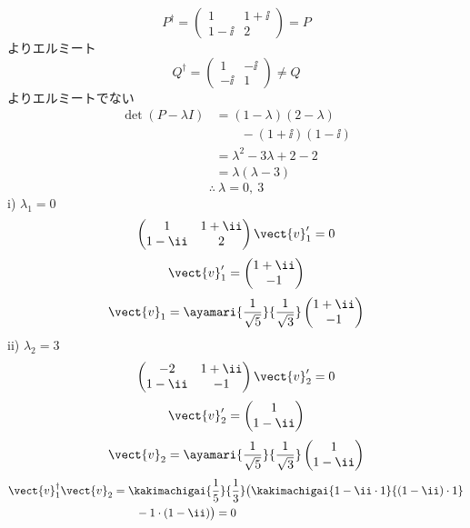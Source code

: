 \[ P^{\dagger}=\begin{pmatrix}1 & 1+\ii\\ 1-\ii & 2\end{pmatrix}=P \]
よりエルミート
\[ Q^{\dagger}=\begin{pmatrix}1 & -\ii\\ -\ii & 1\end{pmatrix}\neq Q \]
よりエルミートでない
\begin{align*}
\det(P-\lambda I)&=(1-\lambda)(2-\lambda)\\
&\qquad-(1+\ii)(1-\ii)\\
&=\lambda^{2}-3\lambda+2-2\\
&=\lambda(\lambda-3)
\end{align*}
\[ \therefore\ \lambda=0,\ 3 \]
i) $\lambda_{1}=0$
\[ \begin{pmatrix}1 & 1+\ii\\ 1-\ii & 2\end{pmatrix}\vect{v}_{1}'=0 \]
\[ \vect{v}_{1}'=\begin{pmatrix}1+\ii\\ -1\end{pmatrix} \]
\[ \vect{v}_{1}=\ayamari{\frac{1}{\sqrt{5}}}{\frac{1}{\sqrt{3}}}\begin{pmatrix}1+\ii\\ -1\end{pmatrix} \]
ii) $\lambda_{2}=3$
\[ \begin{pmatrix}-2 & 1+\ii\\ 1-\ii & -1\end{pmatrix}\vect{v}_{2}'=0 \]
\[ \vect{v}_{2}'=\begin{pmatrix}1\\ 1-\ii\end{pmatrix} \]
\[ \vect{v}_{2}=\ayamari{\frac{1}{\sqrt{5}}}{\frac{1}{\sqrt{3}}}\begin{pmatrix}1\\ 1-\ii\end{pmatrix} \]
\begin{align*}
\vect{v}_{1}^{\dagger}\vect{v}_{2}
&=\kakimachigai{\frac{1}{5}}{\frac{1}{3}}\bigl(\kakimachigai{1-\ii\cdot 1}{(1-\ii)\cdot 1}\\
&\qquad-1\cdot(1-\ii)\bigr)=0
\end{align*}
